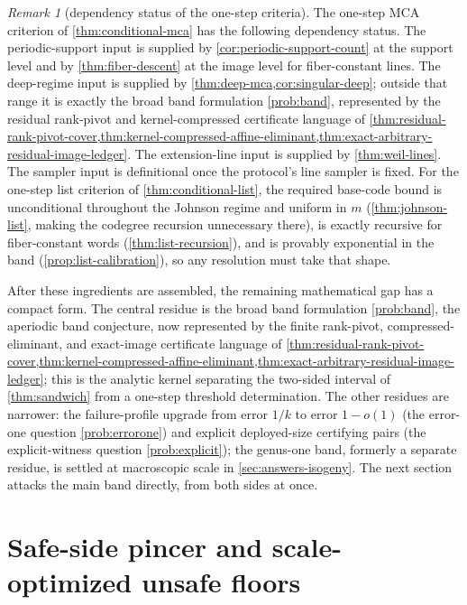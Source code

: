 \documentclass[11pt]{article}
\theoremstyle{definition}
\theoremstyle{remark}
\newtheorem{remark}[remark]{Remark}
\begin{document}
\begin{remark}[dependency status of the one-step criteria]\label{rem:conditional-status}
The one-step MCA criterion of \cref{thm:conditional-mca} has the following dependency status.  The periodic-support input is supplied by \cref{cor:periodic-support-count} at the support level and by \cref{thm:fiber-descent} at the image level for fiber-constant lines.  The deep-regime input is supplied by \cref{thm:deep-mca,cor:singular-deep}; outside that range it is exactly the broad band formulation \cref{prob:band}, represented by the residual rank-pivot and kernel-compressed certificate language of \cref{thm:residual-rank-pivot-cover,thm:kernel-compressed-affine-eliminant,thm:exact-arbitrary-residual-image-ledger}.  The extension-line input is supplied by \cref{thm:weil-lines}.  The sampler input is definitional once the protocol's line sampler is fixed.  For the one-step list criterion of \cref{thm:conditional-list}, the required base-code bound is unconditional throughout the Johnson regime and uniform in $m$ \textup(\cref{thm:johnson-list}, making the codegree recursion unnecessary there\textup), is exactly recursive for fiber-constant words \textup(\cref{thm:list-recursion}\textup), and is provably exponential in the band \textup(\cref{prop:list-calibration}\textup), so any resolution must take that shape.
\end{remark}

After these ingredients are assembled, the remaining mathematical gap has a compact form.  The central residue is the broad band formulation \cref{prob:band}, the aperiodic band conjecture, now represented by the finite rank-pivot, compressed-eliminant, and exact-image certificate language of \cref{thm:residual-rank-pivot-cover,thm:kernel-compressed-affine-eliminant,thm:exact-arbitrary-residual-image-ledger}; this is the analytic kernel separating the two-sided interval of \cref{thm:sandwich} from a one-step threshold determination.  The other residues are narrower: the failure-profile upgrade from error $1/k$ to error $1-o(1)$ \textup(the error-one question \cref{prob:errorone}\textup) and explicit deployed-size certifying pairs \textup(the explicit-witness question \cref{prob:explicit}\textup); the genus-one band, formerly a separate residue, is settled at macroscopic scale in \cref{sec:answers-isogeny}.  The next section attacks the main band directly, from both sides at once.

\section{Safe-side pincer and scale-optimized unsafe floors}\label{sec:pincer}
\end{document}
